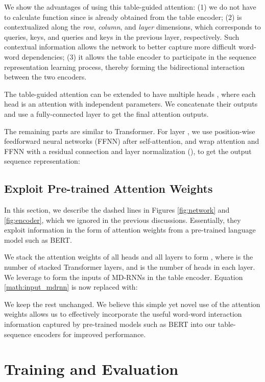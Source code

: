 \documentclass[11pt,a4paper]{article}
\begin{document}
We show the advantages of using this table-guided attention:
(1) we do not have to calculate  function since  is already obtained from the table encoder;
(2)  is contextualized along the \emph{row}, \emph{column}, and \emph{layer} dimensions, which corresponds to {queries, keys, and queries and keys in the previous layer, respectively}. Such contextual information allows the network to better capture more difficult word-word dependencies;
(3) it allows the table encoder to participate in the sequence representation learning process, thereby forming the bidirectional interaction between the two encoders.

The table-guided attention can be extended to have multiple heads \cite{transformer}, where each head is an attention with independent parameters.
We concatenate their outputs and use a fully-connected layer to get the final attention outputs.

The remaining parts are similar to Transformer.
For layer , we use position-wise feedforward neural networks (FFNN) after self-attention,
and wrap attention and FFNN with a residual connection \cite{resnet} and layer normalization (\citealt{layernorm}),
to get the output sequence representation:



\subsection{Exploit Pre-trained Attention Weights}

In this section, we describe the dashed lines in Figures \ref{fig:network} and \ref{fig:encoder}, which we ignored in the previous discussions.
Essentially, they exploit information in the form of attention weights from a pre-trained language model such as BERT.

We stack the attention weights of all heads and all layers to form , where  is the number of stacked Transformer layers, and  is the number of heads in each layer.
We leverage  to form the inputs of MD-RNNs in the table encoder.
Equation \ref{math:input_mdrnn} is now replaced with:


We keep the rest unchanged.
We believe this simple yet novel use of the attention weights allows us to effectively incorporate the useful word-word interaction information captured by pre-trained models such as BERT into our table-sequence encoders for improved performance.

\section{Training and Evaluation}
\end{document}
